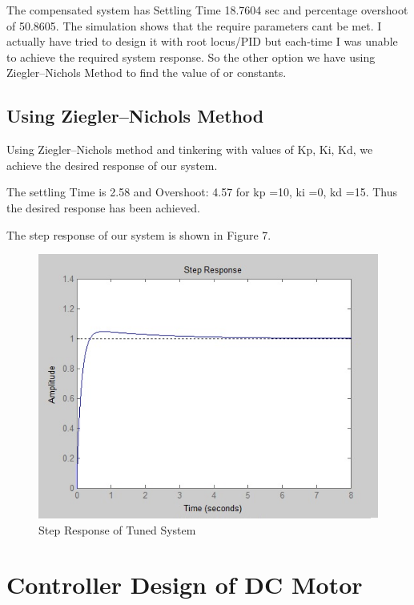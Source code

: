 \documentclass{article}
\begin{document}
The compensated system has Settling Time 18.7604 sec and percentage overshoot of 50.8605. The simulation shows that the require parameters cant be met. I actually have tried to design it with root locus/PID but each-time I was unable to achieve the required system response. So the other option we have using Ziegler–Nichols Method to find the value of or constants.

\subsection{Using Ziegler–Nichols Method}
Using Ziegler–Nichols method and tinkering with values of Kp, Ki, Kd, we achieve the desired response of our system. 

The settling Time is 2.58 and Overshoot: 4.57 for kp =10, ki =0, kd =15. Thus the desired response has been achieved.

The step response of our system is shown in Figure 7.
\begin{figure}[h]
  \includegraphics[width=\linewidth]{step_nz.jpg}
  \caption{Step Response of Tuned System}
  \label{fig:boat1}
\end{figure}


\section{Controller Design of DC Motor}
 
\end{document}
